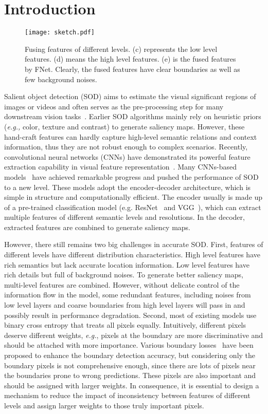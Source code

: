 \documentclass[letterpaper]{article} \usepackage{aaai20}  \usepackage{times}  \usepackage{helvet} \usepackage{courier}  \usepackage[hyphens]{url}  \usepackage{graphicx} \urlstyle{rm} \def\UrlFont{\rm}  \usepackage{graphicx}  \frenchspacing  \setlength{\pdfpagewidth}{8.5in}  \setlength{\pdfpageheight}{11in}
\begin{document}
\section{Introduction}
\begin{figure}[htb]
  \centering
  \texttt{[image: sketch.pdf]}
  \caption{Fusing features of different levels. (c) represents the low level features. (d) means the high level features. (e) is the fused features by FNet. Clearly, the fused features have clear boundaries as well as few background noises.}
  \label{fusion_feature}
\end{figure}
Salient object detection (SOD) aims to estimate the visual significant regions of images or videos and often serves as the pre-processing step for many downstream vision tasks~\cite{Survey}. Earlier SOD algorithms mainly rely on heuristic priors ({\it e.g.,} color, texture and contrast) to generate saliency maps. However, these hand-craft features can hardly capture high-level semantic relations and context information, thus they are not robust enough to complex scenarios. Recently, convolutional neural networks (CNNs) have demonstrated its powerful feature extraction capability in visual feature representation~\cite{ExFuse,Inception,Densenet,SENet}. Many CNNs-based models~\cite{DSS,BASNet,RAS,CPD,C2SNet,PAGR,AFNet,SRM,Amulet} have achieved remarkable progress and pushed the performance of SOD to a new level. These models adopt the encoder-decoder architecture, which is simple in structure and computationally efficient. The encoder usually is made up of a pre-trained classification model (e.g. ResNet~\cite{Resnet} and VGG~\cite{VGG}), which can extract multiple features of different semantic levels and resolutions. In the decoder, extracted features are combined to generate saliency maps.

However, there still remains two big challenges in accurate SOD. First, features of different levels have different distribution characteristics. High level features have rich semantics but lack accurate location information. Low level features have rich details but full of background noises. To generate better saliency maps, multi-level features are combined. However, without delicate control of the information flow in the model, some redundant features, including noises from low level layers and coarse boundaries from high level layers will pass in and possibly result in performance degradation. Second, most of existing models use binary cross entropy that treats all pixels equally. Intuitively, different pixels deserve different weights, {\it e.g.}, pixels at the boundary are more discriminative and should be attached with more importance. Various boundary losses~\cite{BASNet,AFNet} have been proposed to enhance the boundary detection accuracy, but considering only the boundary pixels is not comprehensive enough, since there are lots of pixels near the boundaries prone to wrong predictions. These pixels are also important and should be assigned with larger weights. In consequence, it is essential to design a mechanism to reduce the impact of inconsistency between features of different levels and assign larger weights to those truly important pixels.
\end{document}
